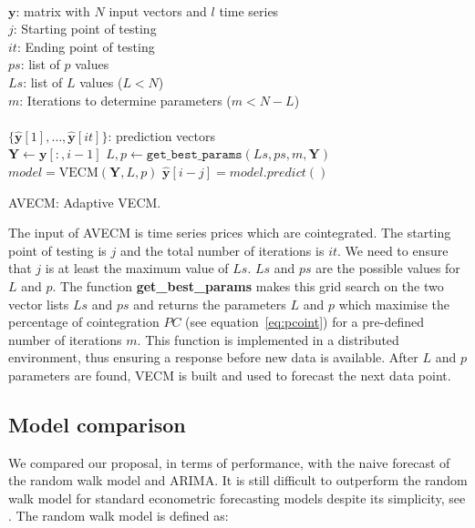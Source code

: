 \begin{algorithm}[ht!]
\begin{algorithmic}[1]
\REQUIRE $\,$ \\
$\mathbf{y}$: matrix with $N$ input vectors and $l$ time series\\
$j$: Starting point of testing \\
$it$: Ending point of testing \\
$ps$: list of $p$ values \\
$Ls$: list of $L$ values ($L<N$) \\
$m$: Iterations to determine parameters ($m < N-L$)\\
\ENSURE  $\,$ \\
$\{ \hat{\mathbf{y}}[1],\dots,\hat{\mathbf{y}}[it]\}$: prediction vectors \\
   \STATE $\mathbf{Y} \gets \mathbf{y}[:,i-1]$
    \STATE $L,p \gets
    \texttt{get\_best\_params}(Ls,ps,m,\mathbf{Y})$
        \STATE $model = \text{VECM}(\mathbf{Y},L, p)$
        \STATE $\hat{\mathbf{y}}[i-j] = model.predict()$
\ENDFOR
\end{algorithmic}
\caption{AVECM: Adaptive VECM.}
\label{alg:AVECM}
\end{algorithm}

The input of AVECM is time series prices which are cointegrated. The starting
point of testing is $j$ and the total number of iterations is $it$. We need to
ensure that $j$ is at least the maximum value of $Ls$. $Ls$ and $ps$ are the
possible values for $L$ and $p$.  The function {\bf get\_best\_params} makes
this grid search on the two vector lists $Ls$ and $ps$ and returns the
parameters $L$ and $p$ which maximise the percentage of cointegration $PC$ (see
equation~\ref{eq:pcoint}) for a pre-defined number of iterations $m$. This
function is implemented in a distributed environment, thus ensuring a response
before new data is available.  After $L$ and $p$ parameters are found, VECM is
built and used to forecast the next data point.


\subsection{Model comparison}
We compared our proposal, in terms of performance, with the naive forecast of
the random walk model and ARIMA. It is still difficult to outperform the random
walk model for standard econometric forecasting models  despite its
simplicity, see \cite{lo2011}. The random walk model is defined as:

